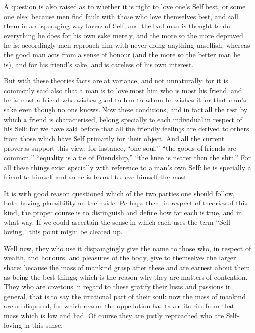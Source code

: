 
A question is also raised as to whether it is right to love one’s Self
best, or some one else: because men find fault with those who love themselves
best, and call them in a disparaging way lovers of Self; and the bad man is
thought to do everything he does for his own sake merely, and the more so the
more depraved he is; accordingly men reproach him with never doing anything
unselfish: whereas the good man acts from a sense of honour (and the more so
the better man he is), and for his friend’s sake, and is careless of his
own interest.

But with these theories facts are at variance, and not unnaturally: for it is
commonly said also that a man is to love most him who is most his friend, and
he is most a friend who wishes good to him to whom he wishes it for that
man’s sake even though no one knows. Now these conditions, and in fact
all the rest by which a friend is characterised, belong specially to each
individual in respect of his Self: for we have said before that all the
friendly feelings are derived to others from those which have Self primarily
for their object. And all the current proverbs support this view; for instance,
“one soul,” “the goods of friends are common,”
“equality is a tie of Friendship,” “the knee is nearer than
the shin.” For all these things exist specially with reference to a
man’s own Self: he is specially a friend to himself and so he is bound to
love himself the most.

It is with good reason questioned which of the two parties one should follow,
both having plausibility on their side. Perhaps then, in respect of theories of
this kind, the proper course is to distinguish and define how far each is true,
and in what way. If we could ascertain the sense in which each uses the term
“Self-loving,” this point might be cleared up.

Well now, they who use it disparagingly give the name to those who, in respect
of wealth, and honours, and pleasures of the body, give to themselves the
larger share: because the mass of mankind grasp after these and are earnest
about them as being the best things; which is the reason why they are matters
of contention. They who are covetous in regard to these gratify their lusts and
passions in general, that is to say the irrational part of their soul: now the
mass of mankind are so disposed, for which reason the appellation has taken its
rise from that mass which is low and bad. Of course they are justly reproached
who are Self-loving in this sense.

